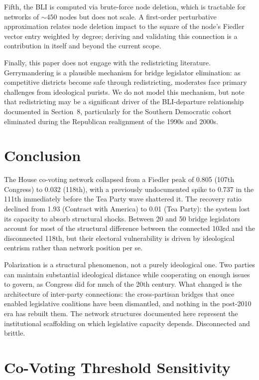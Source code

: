 \documentclass[12pt, a4paper]{article}
\begin{document}
Fifth, the BLI is computed via brute-force node deletion, which is tractable for networks of ${\sim}450$ nodes but does not scale. A first-order perturbative approximation relates node deletion impact to the square of the node's Fiedler vector entry weighted by degree; deriving and validating this connection is a contribution in itself and beyond the current scope.

Finally, this paper does not engage with the redistricting literature. Gerrymandering is a plausible mechanism for bridge legislator elimination: as competitive districts become safe through redistricting, moderates face primary challenges from ideological purists. We do not model this mechanism, but note that redistricting may be a significant driver of the BLI-departure relationship documented in Section~8, particularly for the Southern Democratic cohort eliminated during the Republican realignment of the 1990s and 2000s.

\section{Conclusion}

The House co-voting network collapsed from a Fiedler peak of 0.805 (107th Congress) to 0.032 (118th), with a previously undocumented spike to 0.737 in the 111th immediately before the Tea Party wave shattered it. The recovery ratio declined from 1.93 (Contract with America) to 0.01 (Tea Party): the system lost its capacity to absorb structural shocks. Between 20 and 50 bridge legislators account for most of the structural difference between the connected 103rd and the disconnected 118th, but their electoral vulnerability is driven by ideological centrism rather than network position per se.

Polarization is a structural phenomenon, not a purely ideological one. Two parties can maintain substantial ideological distance while cooperating on enough issues to govern, as Congress did for much of the 20th century. What changed is the architecture of inter-party connections: the cross-partisan bridges that once enabled legislative coalitions have been dismantled, and nothing in the post-2010 era has rebuilt them. The network structures documented here represent the institutional scaffolding on which legislative capacity depends. Disconnected and brittle.




\appendix

\section{Co-Voting Threshold Sensitivity}
\label{app:threshold}
\end{document}
